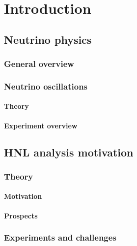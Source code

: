 \documentclass[../main.tex]{subfiles}
\begin{document}
\part{Introduction}
\label{part:intro:general}

\chapter{Neutrino physics}
\section{General overview}
\section{Neutrino oscillations}
\subsection{Theory}
\subsection{Experiment overview}
\chapter{HNL analysis motivation}
\label{ch:intro:HNL}
\section{Theory}
\subsection{Motivation}
\subsection{Prospects}
\section{Experiments and challenges}
\end{document}
